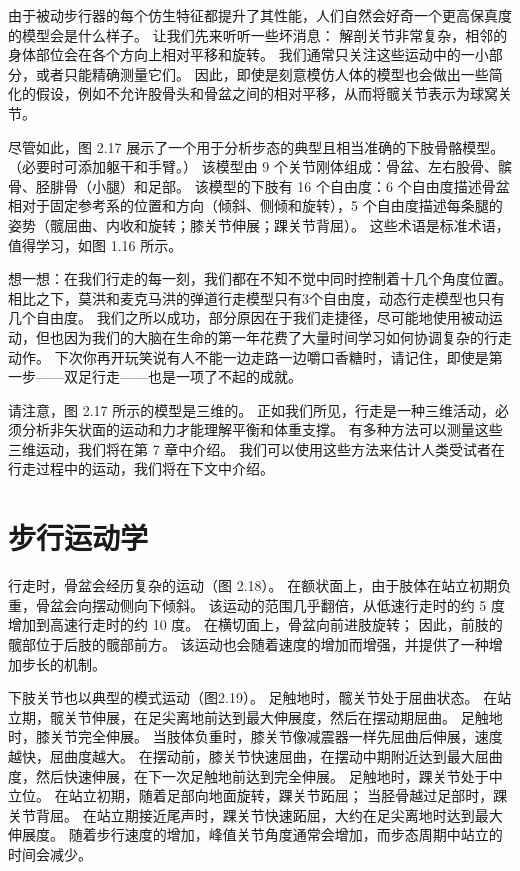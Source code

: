 由于被动步行器的每个仿生特征都提升了其性能，人们自然会好奇一个更高保真度的模型会是什么样子。
让我们先来听听一些坏消息：
解剖关节非常复杂，相邻的身体部位会在各个方向上相对平移和旋转。
我们通常只关注这些运动中的一小部分，或者只能精确测量它们。
因此，即使是刻意模仿人体的模型也会做出一些简化的假设，例如不允许股骨头和骨盆之间的相对平移，从而将髋关节表示为球窝关节。


尽管如此，图 2.17 展示了一个用于分析步态的典型且相当准确的下肢骨骼模型。（必要时可添加躯干和手臂。）
该模型由 9 个关节刚体组成：骨盆、左右股骨、髌骨、胫腓骨（小腿）和足部。
该模型的下肢有 16 个自由度：6 个自由度描述骨盆相对于固定参考系的位置和方向（倾斜、侧倾和旋转），5 个自由度描述每条腿的姿势（髋屈曲、内收和旋转；膝关节伸展；踝关节背屈）。
这些术语是标准术语，值得学习，如图 1.16 所示。


想一想：在我们行走的每一刻，我们都在不知不觉中同时控制着十几个角度位置。
相比之下，莫洪和麦克马洪的弹道行走模型只有3个自由度，动态行走模型也只有几个自由度。
我们之所以成功，部分原因在于我们走捷径，尽可能地使用被动运动，但也因为我们的大脑在生命的第一年花费了大量时间学习如何协调复杂的行走动作。
下次你再开玩笑说有人不能一边走路一边嚼口香糖时，请记住，即使是第一步——双足行走——也是一项了不起的成就。


请注意，图 2.17 所示的模型是三维的。
正如我们所见，行走是一种三维活动，必须分析非矢状面的运动和力才能理解平衡和体重支撑。
有多种方法可以测量这些三维运动，我们将在第 7 章中介绍。
我们可以使用这些方法来估计人类受试者在行走过程中的运动，我们将在下文中介绍。


\section{步行运动学}

行走时，骨盆会经历复杂的运动（图 2.18）。
在额状面上，由于肢体在站立初期负重，骨盆会向摆动侧向下倾斜。
该运动的范围几乎翻倍，从低速行走时的约 5 度增加到高速行走时的约 10 度。
在横切面上，骨盆向前进肢旋转；
因此，前肢的髋部位于后肢的髋部前方。
该运动也会随着速度的增加而增强，并提供了一种增加步长的机制。


下肢关节也以典型的模式运动（图2.19）。
足触地时，髋关节处于屈曲状态。
在站立期，髋关节伸展，在足尖离地前达到最大伸展度，然后在摆动期屈曲。
足触地时，膝关节完全伸展。
当肢体负重时，膝关节像减震器一样先屈曲后伸展，速度越快，屈曲度越大。
在摆动前，膝关节快速屈曲，在摆动中期附近达到最大屈曲度，然后快速伸展，在下一次足触地前达到完全伸展。
足触地时，踝关节处于中立位。
在站立初期，随着足部向地面旋转，踝关节跖屈；
当胫骨越过足部时，踝关节背屈。
在站立期接近尾声时，踝关节快速跖屈，大约在足尖离地时达到最大伸展度。
随着步行速度的增加，峰值关节角度通常会增加，而步态周期中站立的时间会减少。


